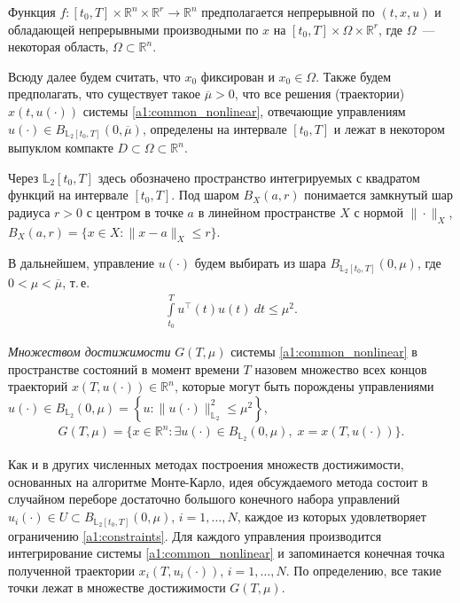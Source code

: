 \documentclass[../main.tex]{subfiles}
\begin{document}
Функция $ f: [t_0, {T}] \times \mathbb{R}^n \times \mathbb{R}^r \rightarrow \mathbb{R}^{n} $ предполагается непрерывной по $(t,x,u)$ и обладающей непрерывными производными по $ x $ на $ [t_0, {T}] \times \Omega \times \mathbb{R}^r $, где $\Omega$~--- некоторая область, $\Omega \subset \mathbb{R}^n$.

Всюду далее будем считать, что $x_0$ фиксирован и $x_0 \in \Omega $.
Также будем предполагать, что существует такое $\overline{\mu} > 0 $, что все решения (траектории) $ x(t, u(\cdot)) $ системы \eqref{a1:common_nonlinear}, отвечающие управлениям $u(\cdot) \in B_{\mathbb{L}_2[t_0, {T}]}(0,\overline{\mu})$, определены на интервале $ [t_0,{T}] $ и лежат в некотором выпуклом компакте $D \subset \Omega \subset \mathbb{R}^n$. 
 
Через $\mathbb{L}_2[t_0, {T}]$ здесь обозначено пространство интегрируемых с квадратом функций на интервале $[t_0, {T}]$. 
Под шаром $B_X(a,r)$ понимается замкнутый шар радиуса $r>0$ с центром в точке $a$ в линейном пространстве $X$ с нормой $\|\cdot\|_X$, $B_X(a, r) = \{x\in X: \|x-a\|_X \leqslant r \}$.
 
В дальнейшем, управление $ u(\cdot) $ будем выбирать из шара $ B_{\mathbb{L}_2[t_0, {T}]}(0,\mu) $, где $ 0 < \mu < \overline{\mu} $, т.\,е.
\begin{gather}\label{a1:constraints}
	\int\limits_{t_0}^T u^{\top}(t) u(t) \ dt \leqslant \mu^2.
\end{gather}
 
{\sl Множеством достижимости } $ G(T,\mu) $ системы \eqref{a1:common_nonlinear} в пространстве состояний в момент времени $ T $ назовем множество всех концов траекторий $ x(T, u(\cdot)) \in \mathbb{R}^n $, которые могут быть порождены управлениями $ u(\cdot) \in B_{\mathbb{L}_2}(0,\mu) =\left\lbrace u:\lVert u(\cdot)\rVert^2_{\mathbb{L}_2} \leqslant \mu^2\right\rbrace $,
\begin{gather*}
	G(T,\mu)=\{x\in \mathbb{R}^n:\exists u(\cdot)\in B_{\mathbb{L}_2}(0,\mu),\; x=x(T,u(\cdot))\}.
\end{gather*}
 
Как и в других численных методах построения множеств достижимости, основанных на алгоритме Монте-Карло, идея обсуждаемого метода состоит в случайном переборе достаточно большого конечного набора управлений $u_i(\cdot) \in U \subset B_{\mathbb{L}_2[t_0, {T}]}(0,\mu) $, $ i = 1, \dots, N$, каждое из которых удовлетворяет ограничению \eqref{a1:constraints}.
Для каждого управления производится интегрирование системы \eqref{a1:common_nonlinear} и запоминается конечная точка полученной траектории $x_i(T, u_i(\cdot))$, $ i = 1, \dots, N$. 
По определению, все такие точки лежат в множестве достижимости $G(T,\mu)$.
 
\end{document}
